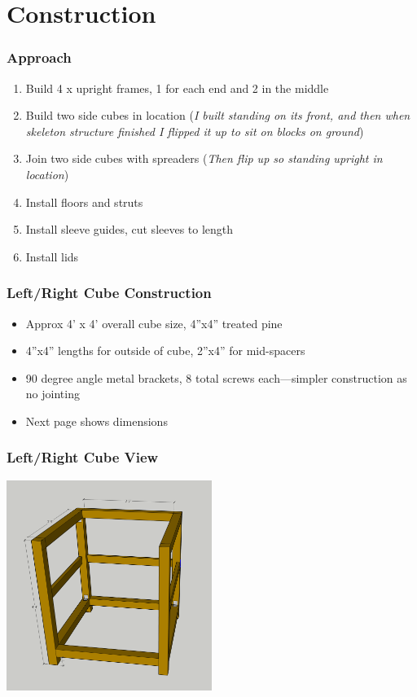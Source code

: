 \documentclass{beamer}
\begin{document}
\section{Construction}

\begin{frame}
  \frametitle{Approach}
  \begin{enumerate}
  \item Build 4 x upright frames, 1 for each end and 2 in the middle
  \item Build two side cubes in location (\emph{I built standing on its front, and then when skeleton structure finished I flipped it up to sit on blocks on ground})
  \item Join two side cubes with spreaders (\emph{Then flip up so standing upright in location})
  \item Install floors and struts
  \item Install sleeve guides, cut sleeves to length
  \item Install lids
  \end{enumerate}
\end{frame}

\begin{frame}
  \frametitle{Left/Right Cube Construction}
  \begin{itemize}
  \item Approx 4' x 4' overall cube size, 4''x4'' treated pine
  \item 4''x4'' lengths for outside of cube, 2''x4'' for mid-spacers
  \item 90 degree angle metal brackets, 8 total screws each---simpler construction as no jointing
  \item Next page shows dimensions
  \end{itemize}
\end{frame}

\begin{frame}
  \frametitle{Left/Right Cube View}
  \begin{center}
  \includegraphics[width=0.5\textwidth]{images/SideCubeFull.png}
  \end{center}
\end{frame}
\end{document}
